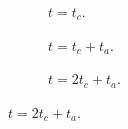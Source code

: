 \begin{figure}[tbp]
\begin{subfigure}{.33\textwidth}
 \caption{$t=t_c$.}
\end{subfigure}
%
\begin{subfigure}{.33\textwidth}
 \centering 
 \caption{$t=t_c+t_a$.}
\end{subfigure}
%
\begin{subfigure}{.33\textwidth}
 \centering 
 \caption{$t=2t_c+t_a$.}
\end{subfigure}

\end{figure}

